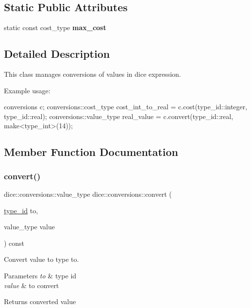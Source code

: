 \subsection*{Static Public Attributes}
\begin{DoxyCompactItemize}
\item 
static const cost\+\_\+type {\bfseries max\+\_\+cost}
\end{DoxyCompactItemize}


\subsection{Detailed Description}
This class manages conversions of values in dice expression. 

Example usage\+: 
\begin{DoxyCode}
conversions c;
conversions::cost\_type cost\_int\_to\_real = c.cost(type\_id::integer, type\_id::real);
conversions::value\_type real\_value = c.convert(type\_id::real, make<type\_int>(14));
\end{DoxyCode}
 

\subsection{Member Function Documentation}
\mbox{\label{classdice_1_1conversions_ab6a95940f7c218a4e610a81b9b838291}} 
\subsubsection{\texorpdfstring{convert()}{convert()}}
{\footnotesize\ttfamily dice\+::conversions\+::value\+\_\+type dice\+::conversions\+::convert (\begin{DoxyParamCaption}\item[{\mbox{\hyperlink{value_8hpp_ab9af7d8ecc381e026ca4d07a745f23eb}{type\+\_\+id}}}]{to,  }\item[{value\+\_\+type}]{value }\end{DoxyParamCaption}) const}



Convert value to type {\ttfamily to}. 


\begin{DoxyParams}{Parameters}
{\em to} & type id \\
\hline
{\em value} & to convert\\
\hline
\end{DoxyParams}
\begin{DoxyReturn}{Returns}
converted value 
\end{DoxyReturn}
\mbox{\label{classdice_1_1conversions_adbc4f917f240f7ab4440cfc7d81e6250}} 
